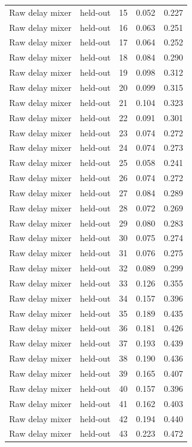 \begin{tabular}{llrrr}
Raw delay mixer & held-out & 15 & 0.052 & 0.227 \\
Raw delay mixer & held-out & 16 & 0.063 & 0.251 \\
Raw delay mixer & held-out & 17 & 0.064 & 0.252 \\
Raw delay mixer & held-out & 18 & 0.084 & 0.290 \\
Raw delay mixer & held-out & 19 & 0.098 & 0.312 \\
Raw delay mixer & held-out & 20 & 0.099 & 0.315 \\
Raw delay mixer & held-out & 21 & 0.104 & 0.323 \\
Raw delay mixer & held-out & 22 & 0.091 & 0.301 \\
Raw delay mixer & held-out & 23 & 0.074 & 0.272 \\
Raw delay mixer & held-out & 24 & 0.074 & 0.273 \\
Raw delay mixer & held-out & 25 & 0.058 & 0.241 \\
Raw delay mixer & held-out & 26 & 0.074 & 0.272 \\
Raw delay mixer & held-out & 27 & 0.084 & 0.289 \\
Raw delay mixer & held-out & 28 & 0.072 & 0.269 \\
Raw delay mixer & held-out & 29 & 0.080 & 0.283 \\
Raw delay mixer & held-out & 30 & 0.075 & 0.274 \\
Raw delay mixer & held-out & 31 & 0.076 & 0.275 \\
Raw delay mixer & held-out & 32 & 0.089 & 0.299 \\
Raw delay mixer & held-out & 33 & 0.126 & 0.355 \\
Raw delay mixer & held-out & 34 & 0.157 & 0.396 \\
Raw delay mixer & held-out & 35 & 0.189 & 0.435 \\
Raw delay mixer & held-out & 36 & 0.181 & 0.426 \\
Raw delay mixer & held-out & 37 & 0.193 & 0.439 \\
Raw delay mixer & held-out & 38 & 0.190 & 0.436 \\
Raw delay mixer & held-out & 39 & 0.165 & 0.407 \\
Raw delay mixer & held-out & 40 & 0.157 & 0.396 \\
Raw delay mixer & held-out & 41 & 0.162 & 0.403 \\
Raw delay mixer & held-out & 42 & 0.194 & 0.440 \\
Raw delay mixer & held-out & 43 & 0.223 & 0.472 \\

\end{tabular}
